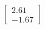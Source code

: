 \documentclass[preview]{standalone}
\begin{document}
\begin{align*}
\begin{bmatrix} 2.61 \\ -1.67 \end{bmatrix}
\end{align*}
\end{document}
